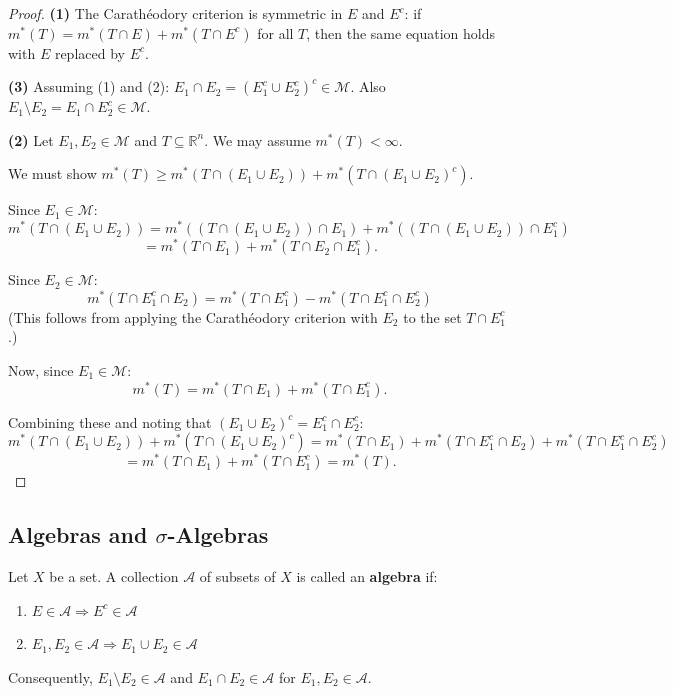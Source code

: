 \documentclass[11pt]{report}
\begin{document}
\begin{proof}
\textbf{(1)} The Carathéodory criterion is symmetric in $E$ and $E^c$: if $m^*(T) = m^*(T \cap E) + m^*(T \cap E^c)$ for all $T$, then the same equation holds with $E$ replaced by $E^c$.

\textbf{(3)} Assuming (1) and (2): $E_1 \cap E_2 = (E_1^c \cup E_2^c)^c \in \mathcal{M}$. Also $E_1 \setminus E_2 = E_1 \cap E_2^c \in \mathcal{M}$.

\textbf{(2)} Let $E_1, E_2 \in \mathcal{M}$ and $T \subseteq \mathbb{R}^n$. We may assume $m^*(T) < \infty$.

We must show $m^*(T) \geq m^*(T \cap (E_1 \cup E_2)) + m^*(T \cap (E_1 \cup E_2)^c)$.

Since $E_1 \in \mathcal{M}$:
\[
m^*(T \cap (E_1 \cup E_2)) = m^*((T \cap (E_1 \cup E_2)) \cap E_1) + m^*((T \cap (E_1 \cup E_2)) \cap E_1^c)
\]
\[
= m^*(T \cap E_1) + m^*(T \cap E_2 \cap E_1^c).
\]

Since $E_2 \in \mathcal{M}$:
\[
m^*(T \cap E_1^c \cap E_2) = m^*(T \cap E_1^c) - m^*(T \cap E_1^c \cap E_2^c)
\]
(This follows from applying the Carathéodory criterion with $E_2$ to the set $T \cap E_1^c$.)

Now, since $E_1 \in \mathcal{M}$:
\[
m^*(T) = m^*(T \cap E_1) + m^*(T \cap E_1^c).
\]

Combining these and noting that $(E_1 \cup E_2)^c = E_1^c \cap E_2^c$:
\[
m^*(T \cap (E_1 \cup E_2)) + m^*(T \cap (E_1 \cup E_2)^c) = m^*(T \cap E_1) + m^*(T \cap E_1^c \cap E_2) + m^*(T \cap E_1^c \cap E_2^c)
\]
\[
= m^*(T \cap E_1) + m^*(T \cap E_1^c) = m^*(T).
\]
\end{proof}

\subsection{Algebras and $\sigma$-Algebras}

\begin{defbox}[Algebra]
Let $X$ be a set. A collection $\mathcal{A}$ of subsets of $X$ is called an \textbf{algebra} if:
\begin{enumerate}
    \item $E \in \mathcal{A} \Rightarrow E^c \in \mathcal{A}$
    \item $E_1, E_2 \in \mathcal{A} \Rightarrow E_1 \cup E_2 \in \mathcal{A}$
\end{enumerate}
Consequently, $E_1 \setminus E_2 \in \mathcal{A}$ and $E_1 \cap E_2 \in \mathcal{A}$ for $E_1, E_2 \in \mathcal{A}$.
\end{defbox}
\end{document}
